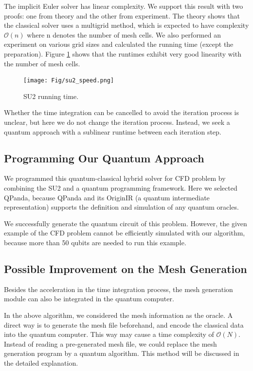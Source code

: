 \documentclass[%
 reprint,
 amsmath,amssymb,
pra,
]{revtex4-1}
\begin{document}
The implicit Euler solver has linear complexity. We support this result with two proofs: one from theory and the other from experiment. The theory shows that the classical solver uses a multigrid method, which is expected to have complexity $\mathcal{O}(n)$ where n denotes the number of mesh cells. We also performed an experiment on various grid sizes and calculated the running time (except the preparation). Figure \ref{su2Speed} shows that the runtimes exhibit very good linearity with the number of mesh cells.

\begin{figure} 
\centering
\texttt{[image: Fig/su2\_speed.png]}
\caption{SU2 running time.} \label{su2Speed}
\end{figure}

Whether the time integration can be cancelled to avoid the iteration process is unclear, but here we do not change the iteration process. Instead, we seek a quantum approach with a sublinear runtime between each iteration step.

\subsection{Programming Our Quantum Approach}
We programmed this quantum-classical hybrid solver for CFD problem by combining the SU2 and a quantum programming framework. Here we selected QPanda, because QPanda and its OriginIR (a quantum intermediate representation) supports the definition and simulation of any quantum oracles.

We successfully generate the quantum circuit of this problem. However, the given example of the CFD problem cannot be efficiently simulated with our algorithm, because more than 50 qubits are needed to run this example. 

\subsection{Possible Improvement on the Mesh Generation}
Besides the acceleration in the time integration process, the mesh generation module can also be integrated in the quantum computer.

In the above algorithm, we considered the mesh information as the oracle. A direct way is to generate the mesh file beforehand, and encode the classical data into the quantum computer. This way may cause a time complexity of $\mathcal{O}(N)$. Instead of reading a pre-generated mesh file, we could replace the mesh generation program by a quantum algorithm. This method will be discussed in the detailed explanation.
\end{document}
